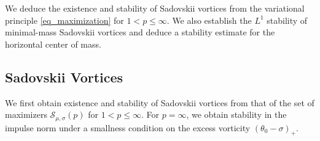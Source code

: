 \documentclass[11pt]{amsart}
\theoremstyle{definition}
\theoremstyle{definition}
\numberwithin{equation}{section}
\newcommand{\0}{\emptyset}
\newcommand{\calS}{\mathcal S}
\begin{document}
			We deduce the existence and stability of Sadovskii vortices from the variational principle \eqref{eq_maximization} for $1<p\leq \infty$. We also establish the $L^{1}$ stability of minimal-mass Sadovskii vortices and deduce a stability estimate for the horizontal center of mass.
			
			
			\subsection{Sadovskii Vortices}\label{sec:finite_p}
			
			We first obtain existence and stability of Sadovskii vortices from that of the set of maximizers $\calS_{\mu,\sigma}(p)$ for $1< p \leq \infty$.
            For $p = \infty$, we obtain stability in the impulse norm { under a smallness condition on the excess vorticity $(\theta_0 - \sigma)_+$.}
			
\end{document}
